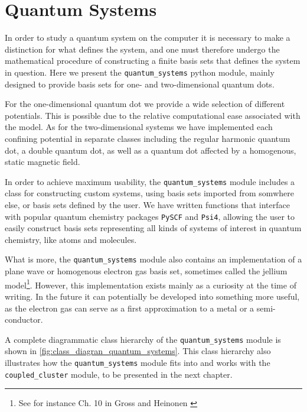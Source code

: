 \chapter{Quantum Systems}
\label{ch:impl_quantum_systems}

In order to study a quantum system on the computer it is necessary to 
make a distinction for what defines the system, and one must therefore undergo the
mathematical procedure of constructing a finite basis sets that defines the system in 
question. Here we present the \lstinline{quantum_systems} python module, mainly designed to 
provide basis sets for one- and two-dimensional quantum dots.

For the one-dimensional quantum dot we provide a wide selection of different
potentials. This is possible due to the relative computational ease associated with the 
model. As for the two-dimensional 
systems we have implemented each confining potential in separate classes including
the regular harmonic quantum dot, a 
double quantum dot, as well as a quantum dot affected by a homogenous, static  magnetic 
field.

In order to achieve maximum usability, the \lstinline{quantum_systems} module
includes a class for constructing custom systems, using basis sets imported from 
somwhere else, or basis sets defined by the user.
We have written functions that interface with popular quantum chemistry packages
\lstinline{PySCF}\cite{PYSCF} 
and \lstinline{Psi4}\cite{parrish2017psi4},
allowing the user to easily construct basis sets 
representing all kinds of systems of interest in quantum chemistry, like atoms and 
molecules. 

What is more, the \lstinline{quantum_systems} module also contains an implementation of 
a plane wave or homogenous electron gas basis set, sometimes called the 
jellium 
model\footnote{See for instance Ch. 10 in Gross and Heinonen \cite{gross1986many}}.
However, this implementation exists mainly as 
a curiosity at the time of writing. In the future it can potentially
be developed into something more useful,
as the electron gas can serve as a first approximation to a metal or a semi-conductor.

A complete diagrammatic class hierarchy of the \lstinline{quantum_systems} module 
is shown in \autoref{fig:class_diagran_quantum_systems}. This class hierarchy also illustrates how 
the \lstinline{quantum_systems} module fits into and works with the 
\lstinline{coupled_cluster} module, to be presented in the next chapter.

